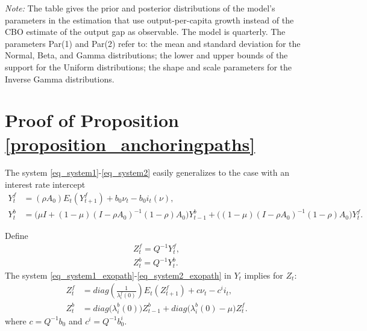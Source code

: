 \begin{table}
\begin{center}
		\begin{minipage}[c]{6.0in}
			\footnotesize \baselineskip=11pt \vspace{5pt} 
			\emph{Note:} The table gives the prior and posterior distributions of the model's parameters in the estimation that use output-per-capita growth instead of the CBO estimate of the output gap as observable. The model is quarterly. The parameters Par(1) and Par(2) refer to: the mean and standard deviation for the Normal, Beta, and Gamma distributions; the lower and upper bounds of the support for the Uniform distributions; the shape and scale parameters for the Inverse Gamma distributions.
		\end{minipage}	
	\end{center}
	\label{table_estimation_outputgrowth}
\end{table}

\section{Proof of Proposition \ref{proposition_anchoringpaths}}\label{appendix_anchoringpaths}
The system \eqref{eq_system1}-\eqref{eq_system2} easily generalizes to the case with an interest rate intercept
\begin{align}
Y^f_t &= (\rho A_0) E_t(Y^f_{t+1}) + b_0 \nu_t -b_0 i_t(\nu),\label{eq_system1_exopath}\\
Y^b_t &= \bigg(\mu I + (1-\mu) (I-\rho A_0)^{-1}(1-\rho)A_0\bigg) Y^b_{t-1} + \bigg((1-\mu) (I-\rho A_0)^{-1}(1-\rho)A_0\bigg) Y^f_t.\label{eq_system2_exopath}
\end{align}

Define
\begin{align}
Z^f_t = Q^{-1}Y^f_t,\\
Z^b_t = Q^{-1}Y^b_t.
\end{align}
The system \eqref{eq_system1_exopath}-\eqref{eq_system2_exopath} in $Y_t$ implies for $Z_t$:
\begin{align}
Z^f_t &= diag\left(\frac{1}{\lambda^f_i(0)}\right) E_t(Z^f_{t+1}) + c \nu_t - c^i i_t,\\
Z^b_t &=diag\bigg(\lambda^b_i(0)\bigg) Z^b_{t-1} + diag\bigg(\lambda^b_i(0)-\mu\bigg) Z^f_t.
\end{align}
where $c=Q^{-1}b_0$ and $c^i = Q^{-1}b_0^i$.

